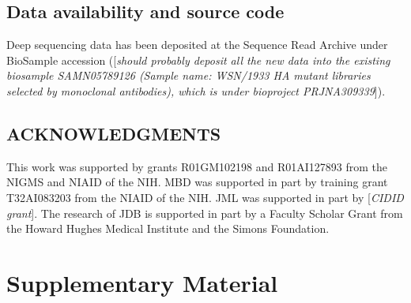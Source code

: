 \documentclass[11pt]{article}
\newcommand{\comment}[1]{{\color{red}[\textsl{#1}]}}
\begin{document}
\subsection*{Data availability and source code}
Deep sequencing data has been deposited at the Sequence Read Archive under BioSample accession (\comment{should probably deposit all the new data into the existing biosample SAMN05789126 (Sample name: WSN/1933 HA mutant libraries selected by monoclonal antibodies), which is under bioproject PRJNA309339}).




\clearpage

\small
\subsection*{ACKNOWLEDGMENTS}
This work was supported by grants R01GM102198 and R01AI127893 from the NIGMS and NIAID of the NIH.
MBD was supported in part by training grant T32AI083203 from the NIAID of the NIH.
JML was supported in part by \comment{CIDID grant}.
The research of JDB is supported in part by a Faculty Scholar Grant from the Howard Hughes Medical Institute and the Simons Foundation.




\clearpage
\normalsize

\section*{Supplementary Material}
\end{document}
